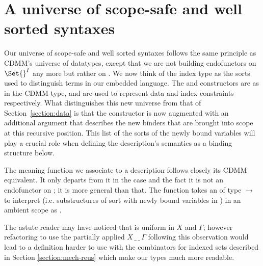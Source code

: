 \section{A universe of scope-safe and well sorted syntaxes}\label{section:universe}

Our universe of scope-safe and well sorted syntaxes follows the same principle
as CDMM's universe of datatypes, except that we are not building endofunctors on
$\Set{}^I$ any more but rather on { }. We now think of the
index type  as the sorts
used to distinguish terms in our embedded language. The  and
 constructors are as in the CDMM  type, and are used to
represent data and index constraints respectively.
What distinguishes this new universe  from that of Section~\ref{section:data}
is that the
 constructor
is now augmented with an additional { } argument that describes
the new binders that are brought into scope at this recursive position. This
list of the sorts of the newly bound variables will play a crucial role when
defining the description's semantics as a binding structure below. %

\begin{center}
\end{center}

The meaning function  we associate to a description follows closely
its CDMM equivalent. It only departs from it in the  case and the fact
it is not an endofunctor on  ; it is more general than that.
The function takes an  of type {  $\rightarrow$  }
to interpret {  } (i.e. substructures of sort  with
newly bound variables in ) in an ambient scope  as {   }.

\begin{center}
\end{center}

The astute reader may have noticed that  is uniform in $X$ and $\Gamma$; however
refactoring  to use the partially applied $X\,\_\,\_\,\Gamma$ following
this observation would lead to a definition harder to use with the
combinators for indexed sets described in Section \ref{section:mech-reus}
which make our types much more readable.

